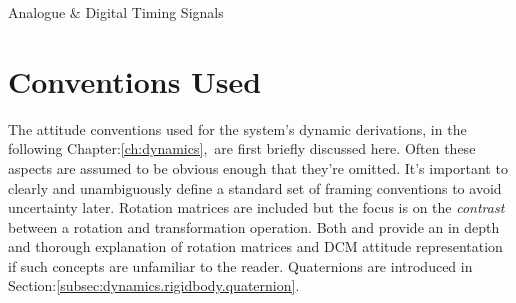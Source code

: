 \begin{table}[h]
\centering
{}
\caption{Analogue \& Digital Timing Signals}
\label{tab:servo}
\end{table}
\section{Conventions Used}
\label{sec:proto.conventions}
The attitude conventions used for the system's dynamic derivations, in the following Chapter:\ref{ch:dynamics},~are first briefly discussed here. Often these aspects are assumed to be obvious enough that they're omitted. It's important to clearly and unambiguously define a standard set of framing conventions to avoid uncertainty later. Rotation matrices are included but the focus is on the \emph{contrast} between a rotation and transformation operation. Both \cite{spacecraftattitutdequaternions} and \cite{rigidbodylecture} provide an in depth and thorough explanation of rotation matrices and DCM attitude representation if such concepts are unfamiliar to the reader. Quaternions are introduced in Section:\ref{subsec:dynamics.rigidbody.quaternion}.
